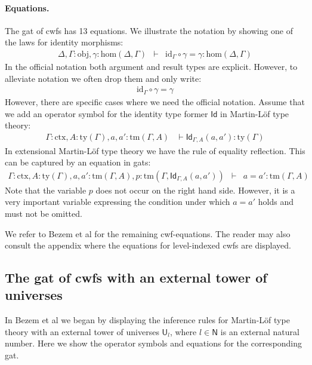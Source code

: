 \documentclass[11pt,a4paper]{article}
\theoremstyle{definition}
\newcommand{\Id}{\mathsf{Id}}
\newcommand{\id}{\mathsf{id}}
\newcommand{\UU}{\mathsf{U}}
\def\UU{\mathsf{U}}
\newcommand{\N}{\mathsf{N}}
\def\Obj{\mathrm{obj}}
\def\Hom{\mathrm{hom}}
\def\id{\mathrm{id}}
\newcommand{\ctx}{\mathrm{ctx}}
\newcommand{\ty}{\mathrm{ty}}
\newcommand{\tm}{\mathrm{tm}}
\begin{document}
\paragraph{Equations.}
The gat of cwfs has 13 equations. We illustrate the notation by showing one of the laws for identity morphisms:\begin{eqnarray*}
\Delta, \Gamma : \Obj, \gamma : \Hom(\Delta,\Gamma) &\vdash& \id_\Gamma \circ \gamma = \gamma : \Hom(\Delta,\Gamma)
\end{eqnarray*}
In the official notation both argument and result types are explicit. However, to alleviate notation we often drop them and only write:
\begin{eqnarray*}
\id_\Gamma \circ \gamma = \gamma
\end{eqnarray*}
However, there are specific cases where we need the official notation. Assume that we add an operator symbol for the identity type former $\Id$ in Martin-Löf type theory:
\begin{eqnarray*}
\Gamma : \ctx, A : \ty(\Gamma), a, a' : \tm(\Gamma, A) &\vdash \Id_{\Gamma,A}(a,a'): \ty(\Gamma)
\end{eqnarray*}
In extensional Martin-Löf type theory \cite{martinlof:hannover} we have the rule of equality reflection. This can be captured by an equation in gats:
\begin{eqnarray*}
\Gamma : \ctx, A : \ty(\Gamma), a, a' : \tm(\Gamma, A),p :  \tm(\Gamma,\Id_{\Gamma,A}(a,a'))&\vdash& a = a' : \tm(\Gamma,A)
\end{eqnarray*}
Note that the variable $p$ does not occur on the right hand side.
However, it is a very important variable expressing
the condition under which $a=a'$ holds and must not be omitted.

We refer to Bezem et al \cite{bezem:hofmann} for the remaining cwf-equations. The reader may also consult the appendix where the equations for level-indexed cwfs are displayed. 


\subsection{The gat of cwfs with an external tower of universes}
In Bezem et al \cite{BezemCDE22} we began by displaying the inference rules for Martin-Löf type theory with an external tower of universes $\UU_l$, where $l \in \N$ is an external natural number. Here we show the operator symbols and equations for the corresponding gat.
\end{document}
